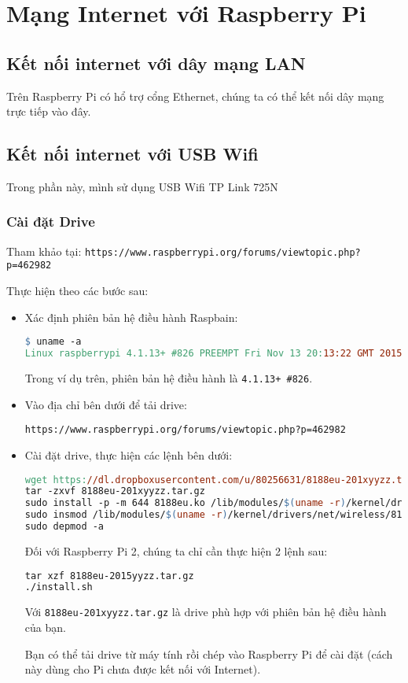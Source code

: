 \chapter{Mạng Internet với Raspberry Pi}
\section{Kết nối internet với dây mạng LAN}
Trên Raspberry Pi có hổ trợ cổng Ethernet, chúng ta có thể kết nối dây mạng trực tiếp vào đây.
\section{Kết nối internet với USB Wifi}
Trong phần này, mình sử dụng USB Wifi TP Link 725N
\subsection{Cài đặt Drive}
Tham khảo tại: \verb|https://www.raspberrypi.org/forums/viewtopic.php?p=462982|

Thực hiện theo các bước sau:
\begin{itemize}
\item Xác định phiên bản hệ điều hành Raspbain:
\begin{lstlisting}[language=make]
$ uname -a
Linux raspberrypi 4.1.13+ #826 PREEMPT Fri Nov 13 20:13:22 GMT 2015 armv6l GNU/Linux
\end{lstlisting}
Trong ví dụ trên, phiên bản hệ điều hành là \verb|4.1.13+ #826|. 
\item Vào địa chỉ bên dưới để tải drive:

\verb|https://www.raspberrypi.org/forums/viewtopic.php?p=462982|
\item Cài đặt drive, thực hiện các lệnh bên dưới:
\begin{lstlisting}[language=make]
wget https://dl.dropboxusercontent.com/u/80256631/8188eu-201xyyzz.tar.gz
tar -zxvf 8188eu-201xyyzz.tar.gz
sudo install -p -m 644 8188eu.ko /lib/modules/$(uname -r)/kernel/drivers/net/wireless
sudo insmod /lib/modules/$(uname -r)/kernel/drivers/net/wireless/8188eu.ko
sudo depmod -a
\end{lstlisting}
Đối với Raspberry Pi 2, chúng ta chỉ cần thực hiện 2 lệnh sau:
\begin{lstlisting}[language=make]
tar xzf 8188eu-2015yyzz.tar.gz
./install.sh
\end{lstlisting}
Với \verb|8188eu-201xyyzz.tar.gz| là drive phù hợp với phiên bản hệ điều hành của bạn.

Bạn có thể tải drive từ máy tính rồi chép vào Raspberry Pi để cài đặt (cách này dùng cho Pi chưa được kết nối với Internet).
\end{itemize}
